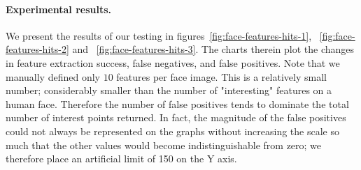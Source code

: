 \paragraph{Experimental results.}
We present the results of our testing in figures~\ref{fig:face-features-hits-1}, ~\ref{fig:face-features-hits-2} and ~\ref{fig:face-features-hits-3}. The charts therein plot the changes in feature extraction success, false negatives, and false positives. Note that we manually defined only $10$ features per face image. This is a relatively small number; considerably smaller than the number of "interesting" features on a human face. Therefore the number of false positives tends to dominate the total number of interest points returned. In fact, the magnitude of the false positives could not always be represented on the graphs without increasing the scale so much that the other values would become indistinguishable from zero; we therefore place an artificial limit of 150 on the Y axis.

